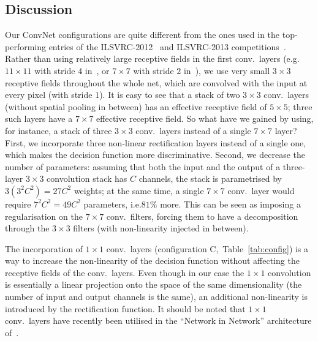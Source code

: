 \documentclass{article} %
\makeatletter
\newcommand{\tblref}[1]{Table~\ref{#1}}
\newcommand{\note}[1]{\textbf{NOTE: #1}}
\newcommand*{\eg}{e.g.\@\xspace}
\newcommand*{\ie}{i.e.\@\xspace}
\makeatother
\begin{document}
\subsection{Discussion}
\label{sec:discuss}
Our ConvNet configurations are quite different from the ones used in the top-performing entries of the ILSVRC-2012~\citep{Krizhevsky12} and ILSVRC-2013 competitions~\citep{Zeiler13,Sermanet14}.
Rather than using relatively large receptive fields in the first conv.\ layers (\eg $11\times 11$ with stride $4$ in~\citep{Krizhevsky12}, or $7 \times 7$ with stride $2$ in~\citep{Zeiler13,Sermanet14}),
we use very small $3 \times 3$ receptive fields throughout the whole net, which are convolved with the input at every pixel (with stride $1$).
It is easy to see that a stack of two $3 \times 3$ conv.\ layers (without spatial pooling in between) has an effective receptive field of $5 \times 5$;
three such layers have a $7 \times 7$ effective receptive field. 
So what have we gained by using, for instance, a stack of three $3 \times 3$ conv.\ layers instead of a single $7 \times 7$ layer?
First, we incorporate three non-linear rectification layers instead of a single one, which makes the decision function more discriminative.
Second, we decrease the number of parameters: assuming that both the input and the output of a three-layer $3 \times 3$ convolution stack has $C$ channels, the stack is parametrised
by $3 \left( 3^2 C^2 \right) = 27 C^2$ weights; at the same time, a single $7\times 7$ conv.\ layer would require $7^2 C^2=49 C^2$ parameters, \ie $81\%$ more.
This can be seen as imposing a regularisation on the $7\times7$ conv.\ filters, forcing them to have a decomposition through the $3 \times 3$ filters (with non-linearity injected in between).

The incorporation of $1\times 1$ conv.\ layers (configuration C,~\tblref{tab:config}) is a way to increase the non-linearity of the decision function without affecting
the receptive fields of the conv.\ layers. Even though in our case the $1\times 1$ convolution is essentially a linear projection onto the space of the same dimensionality 
(the number of input and output channels is the same), an additional non-linearity is introduced by the rectification function.
It should be noted that $1\times 1$ conv.\ layers have recently been utilised in the ``Network in Network'' architecture of~\citet{Lin14}.
\end{document}
